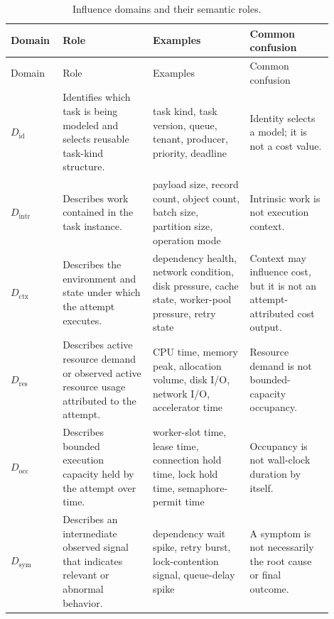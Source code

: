 \begin{longtable}{
p{0.12\linewidth}
p{0.26\linewidth}
p{0.28\linewidth}
p{0.24\linewidth}
}
\caption{Influence domains and their semantic roles.}
\label{tab:influence-domain-semantics}\\

\toprule
Domain & Role & Examples & Common confusion \\
\midrule
\endfirsthead

\toprule
Domain & Role & Examples & Common confusion \\
\midrule
\endhead

\bottomrule
\endfoot

$D_{\mathrm{id}}$ &
Identifies which task is being modeled and selects reusable task-kind
structure. &
task kind, task version, queue, tenant, producer, priority, deadline &
Identity selects a model; it is not a cost value. \\

$D_{\mathrm{intr}}$ &
Describes work contained in the task instance. &
payload size, record count, object count, batch size, partition size, operation
mode &
Intrinsic work is not execution context. \\

$D_{\mathrm{ctx}}$ &
Describes the environment and state under which the attempt executes. &
dependency health, network condition, disk pressure, cache state, worker-pool
pressure, retry state &
Context may influence cost, but it is not an attempt-attributed cost output. \\

$D_{\mathrm{res}}$ &
Describes active resource demand or observed active resource usage attributed to
the attempt. &
CPU time, memory peak, allocation volume, disk I/O, network I/O, accelerator
time &
Resource demand is not bounded-capacity occupancy. \\

$D_{\mathrm{occ}}$ &
Describes bounded execution capacity held by the attempt over time. &
worker-slot time, lease time, connection hold time, lock hold time,
semaphore-permit time &
Occupancy is not wall-clock duration by itself. \\

$D_{\mathrm{sym}}$ &
Describes an intermediate observed signal that indicates relevant or abnormal
behavior. &
dependency wait spike, retry burst, lock-contention signal, queue-delay spike &
A symptom is not necessarily the root cause or final outcome. \\


\end{longtable}
